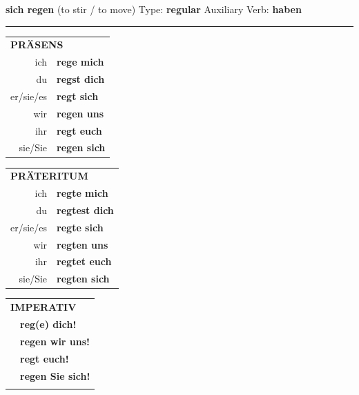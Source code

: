 \documentclass[10pt,a4paper]{revtex4-2}
\begin{document}
\begin{verbbox}
    {\Large \bf sich regen} (to stir / to move) \hfill Type: \textbf{regular} \hfill Auxiliary Verb: \textbf{haben} 
    
     \vspace{5pt}

    \hrule
    
    \vspace{5pt}

  \begin{tabular}{rl}
     \multicolumn{2}{l}{\textbf{PRÄSENS} }\\
    ich & \textbf{rege mich}\\
    du & \textbf{regst dich}\\
    er/sie/es & \textbf{regt sich}\\
    wir & \textbf{regen uns}\\
    ihr & \textbf{regt euch}\\
    sie/Sie & \textbf{regen sich}\\
  \end{tabular}
  \hfill
     \begin{tabular}{rl}
    \multicolumn{2}{l}{\textbf{PRÄTERITUM} }\\
    ich & \textbf{regte mich}\\
    du & \textbf{regtest dich}\\
    er/sie/es & \textbf{regte sich}\\
    wir & \textbf{regten uns}\\
    ihr & \textbf{regtet euch}\\
    sie/Sie & \textbf{regten sich}\\
  \end{tabular}
  \hfill
  \begin{tabular}{rl}
     \multicolumn{2}{l}{\textbf{IMPERATIV} }\\
   & \textbf{reg(e) dich!}\\
   & \textbf{regen wir uns!}\\
   & \textbf{regt euch!}\\
   & \textbf{regen Sie sich!}\\
   & \vspace{10pt}
  \end{tabular}

    \vspace{10pt}


\end{verbbox}
\end{document}
